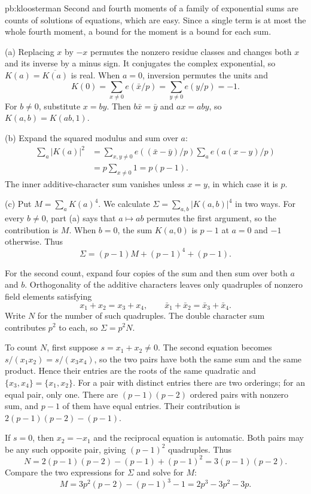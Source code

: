 \begin{solution}{pb:kloosterman}
\idea Second and fourth moments of a family of exponential sums are counts of solutions of equations, which are easy. Since a
single term is at most the whole fourth moment, a bound for the moment is a bound for each sum.

\writeup (a) Replacing $x$ by $-x$ permutes the nonzero residue classes and changes both $x$ and its inverse by a minus sign. It conjugates the complex exponential, so $K(a)=\overline{K(a)}$ is real. When $a=0$, inversion permutes the units and
\[
K(0)=\sum_{x\ne0}e(\bar x/p)=\sum_{y\ne0}e(y/p)=-1.
\]
For $b\ne0$, substitute $x=by$. Then $b\bar x=\bar y$ and $ax=aby$, so $K(a,b)=K(ab,1)$.

(b) Expand the squared modulus and sum over $a$:
\[
\begin{aligned}
\sum_a|K(a)|^2
&=\sum_{x,y\ne0}e((\bar x-\bar y)/p)
  \sum_ae(a(x-y)/p)\\
&=p\sum_{x\ne0}1=p(p-1).
\end{aligned}
\]
The inner additive-character sum vanishes unless $x=y$, in which case it is $p$.

(c) Put $M=\sum_aK(a)^4$. We calculate
$\Sigma=\sum_{a,b}|K(a,b)|^4$ in two ways. For every $b\ne0$, part (a) says that $a\mapsto ab$ permutes the first argument, so the contribution is $M$. When $b=0$, the sum $K(a,0)$ is $p-1$ at $a=0$ and $-1$ otherwise. Thus
\[
\Sigma=(p-1)M+(p-1)^4+(p-1).
\]

For the second count, expand four copies of the sum and then sum over both $a$ and $b$. Orthogonality of the additive characters leaves only quadruples of nonzero field elements satisfying
\[
x_1+x_2=x_3+x_4,\qquad
\bar x_1+\bar x_2=\bar x_3+\bar x_4.
\]
Write $N$ for the number of such quadruples. The double character sum contributes $p^2$ to each, so $\Sigma=p^2N$.

To count $N$, first suppose $s=x_1+x_2\ne0$. The second equation becomes
$s/(x_1x_2)=s/(x_3x_4)$, so the two pairs have both the same sum and the same product. Hence their entries are the roots of the same quadratic and
$\{x_3,x_4\}=\{x_1,x_2\}$. For a pair with distinct entries there are two orderings; for an equal pair, only one. There are $(p-1)(p-2)$ ordered pairs with nonzero sum, and $p-1$ of them have equal entries. Their contribution is
$2(p-1)(p-2)-(p-1)$.

If $s=0$, then $x_2=-x_1$ and the reciprocal equation is automatic. Both pairs may be any such opposite pair, giving $(p-1)^2$ quadruples. Thus
\[
N=2(p-1)(p-2)-(p-1)+(p-1)^2
=3(p-1)(p-2).
\]
Compare the two expressions for $\Sigma$ and solve for $M$:
\[
M=3p^2(p-2)-(p-1)^3-1
=2p^3-3p^2-3p.
\]


\end{solution}
